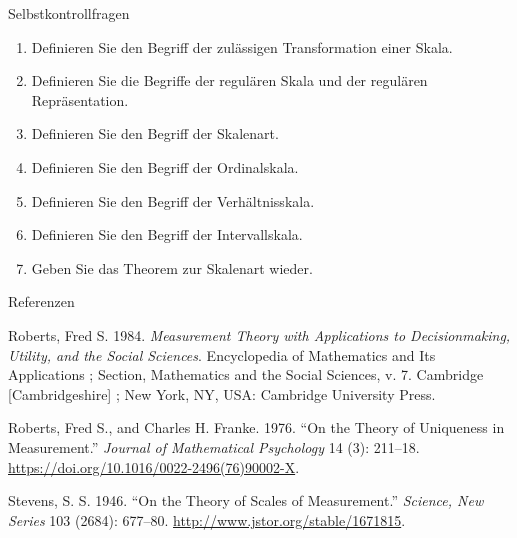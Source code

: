 \documentclass[
  8pt,
  ignorenonframetext,
]{beamer}
\providecommand{\tightlist}{%
  \setlength{\itemsep}{0pt}\setlength{\parskip}{0pt}}
\newlength{\cslhangindent}
\newlength{\cslentryspacingunit} %
\newenvironment{CSLReferences}[2] %
 {%
  \setlength{\parindent}{0pt}
  \ifodd #1
  \let\oldpar\par
  \def\par{\hangindent=\cslhangindent\oldpar}
  \fi
  \setlength{\parskip}{#2\cslentryspacingunit}
 }%
 {}
\begin{document}
\begin{frame}{Selbstkontrollfragen}
\protect\hypertarget{selbstkontrollfragen}{}
\small
{}

\begin{enumerate}
\tightlist
\item
  Definieren Sie den Begriff der zulässigen Transformation einer Skala.
\item
  Definieren Sie die Begriffe der regulären Skala und der regulären
  Repräsentation.
\item
  Definieren Sie den Begriff der Skalenart.
\item
  Definieren Sie den Begriff der Ordinalskala.
\item
  Definieren Sie den Begriff der Verhältnisskala.
\item
  Definieren Sie den Begriff der Intervallskala.
\item
  Geben Sie das Theorem zur Skalenart wieder.
\end{enumerate}
\end{frame}

\begin{frame}{Referenzen}
\protect\hypertarget{referenzen}{}
\footnotesize

\hypertarget{refs}{}
\begin{CSLReferences}{1}{0}
\leavevmode{}%
Roberts, Fred S. 1984. \emph{Measurement Theory with Applications to
Decisionmaking, Utility, and the Social Sciences}. Encyclopedia of
Mathematics and Its Applications ; {Section}, {Mathematics} and the
Social Sciences, v. 7. Cambridge {[}Cambridgeshire{]} ; New York, NY,
USA: Cambridge University Press.

\leavevmode{}%
Roberts, Fred S., and Charles H. Franke. 1976. {``On the Theory of
Uniqueness in Measurement.''} \emph{Journal of Mathematical Psychology}
14 (3): 211--18. \url{https://doi.org/10.1016/0022-2496(76)90002-X}.

\leavevmode{}%
Stevens, S. S. 1946. {``On the {Theory} of {Scales} of {Measurement}.''}
\emph{Science, New Series} 103 (2684): 677--80.
\url{http://www.jstor.org/stable/1671815}.

\end{CSLReferences}
\end{frame}
\end{document}
